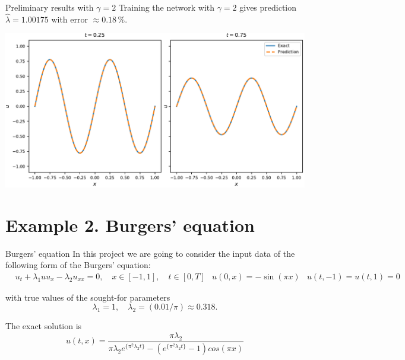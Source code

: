\documentclass{beamer}
\def\\{}%
\begin{document}
\begin{frame}{Preliminary results with $\gamma=2$}
Training the network with $\gamma=2$ gives prediction $\widehat{\lambda} =
1.00175$ with error $\approx 0.18 \,\%$.

\vspace{0.5cm}
\centering
\includegraphics[scale=0.55]{images/heateq-predictions}

\end{frame}




\section{Example 2. Burgers' equation}

\begin{frame}{Burgers' equation}
In this project we are going to consider the input data of the following form of
the Burgers' equation:
\begin{align*}
&u_t + \lambda_1 u u_x - \lambda_2 u_{xx} = 0, \quad x\in[-1, 1], \quad t\in[0, T]\\
&u(0, x) = -\sin(\pi x) \\
&u(t, -1) = u(t, 1) = 0
\end{align*}

with true values of the sought-for parameters
\[
    \lambda_1 = 1,  \quad \lambda_2 = (0.01 / \pi) \approx 0.318.
\]

The exact solution is
$$u(t, x) = \frac{\pi \lambda_2}{\pi \lambda_2 e^{\{\pi^2 \lambda_2 t\}} - (e^{\{\pi^2 \lambda_2 t\}} - 1) cos(\pi x)}$$

\end{frame}
\end{document}

